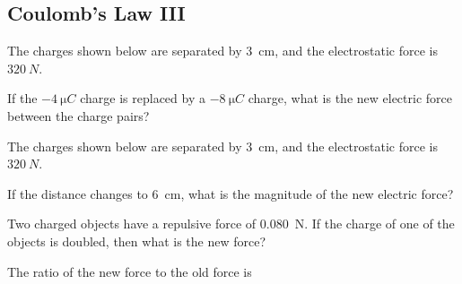 \documentclass[answers]{exam}
\begin{document}
\clearpage

\subsection*{Coulomb's Law III} %

\begin{questions}

\question
The charges shown below are separated by \SI{3}{cm}, and the electrostatic force is $\SI{320}{N}$.

\begin{center}
\end{center}

If the $-\SI{4}{\micro C}$ charge is replaced by a $-\SI{8}{\micro C}$ charge, what is the new electric force between the charge pairs?

\question
The charges shown below are separated by \SI{3}{cm}, and the electrostatic force is $\SI{320}{N}$.

\begin{center}
\end{center}

If the distance changes to \SI{6}{cm}, what is the magnitude of the new electric force?

\question
Two charged objects have a repulsive force of \SI{0.080}{N}. If the charge of one of the objects is doubled, then what is the new force?

\begin{solution}
The ratio of the new force to the old force is


\end{solution}
\end{questions}
\end{document}
